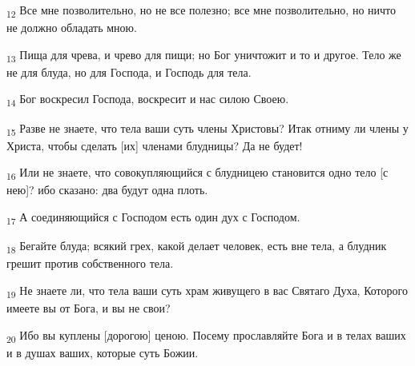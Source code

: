 \begin{tcolorbox}
\textsubscript{12} Все мне позволительно, но не все полезно; все мне позволительно, но ничто не должно обладать мною.
\end{tcolorbox}
\begin{tcolorbox}
\textsubscript{13} Пища для чрева, и чрево для пищи; но Бог уничтожит и то и другое. Тело же не для блуда, но для Господа, и Господь для тела.
\end{tcolorbox}
\begin{tcolorbox}
\textsubscript{14} Бог воскресил Господа, воскресит и нас силою Своею.
\end{tcolorbox}
\begin{tcolorbox}
\textsubscript{15} Разве не знаете, что тела ваши суть члены Христовы? Итак отниму ли члены у Христа, чтобы сделать [их] членами блудницы? Да не будет!
\end{tcolorbox}
\begin{tcolorbox}
\textsubscript{16} Или не знаете, что совокупляющийся с блудницею становится одно тело [с нею]? ибо сказано: два будут одна плоть.
\end{tcolorbox}
\begin{tcolorbox}
\textsubscript{17} А соединяющийся с Господом есть один дух с Господом.
\end{tcolorbox}
\begin{tcolorbox}
\textsubscript{18} Бегайте блуда; всякий грех, какой делает человек, есть вне тела, а блудник грешит против собственного тела.
\end{tcolorbox}
\begin{tcolorbox}
\textsubscript{19} Не знаете ли, что тела ваши суть храм живущего в вас Святаго Духа, Которого имеете вы от Бога, и вы не свои?
\end{tcolorbox}
\begin{tcolorbox}
\textsubscript{20} Ибо вы куплены [дорогою] ценою. Посему прославляйте Бога и в телах ваших и в душах ваших, которые суть Божии.
\end{tcolorbox}
